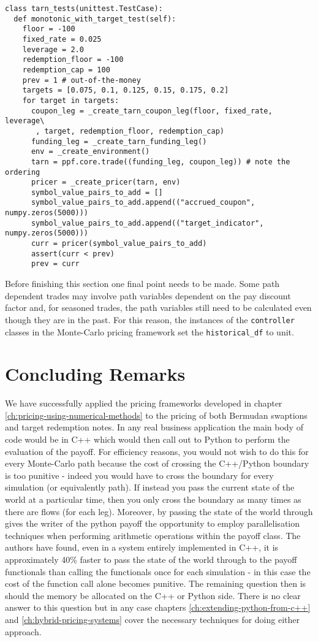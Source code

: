 \begin{verbatim}
class tarn_tests(unittest.TestCase):
  def monotonic_with_target_test(self):
    floor = -100
    fixed_rate = 0.025
    leverage = 2.0
    redemption_floor = -100
    redemption_cap = 100
    prev = 1 # out-of-the-money
    targets = [0.075, 0.1, 0.125, 0.15, 0.175, 0.2]
    for target in targets:
      coupon_leg = _create_tarn_coupon_leg(floor, fixed_rate, leverage\
       , target, redemption_floor, redemption_cap)
      funding_leg = _create_tarn_funding_leg()
      env = _create_environment()
      tarn = ppf.core.trade((funding_leg, coupon_leg)) # note the ordering
      pricer = _create_pricer(tarn, env)
      symbol_value_pairs_to_add = []
      symbol_value_pairs_to_add.append(("accrued_coupon", numpy.zeros(5000)))
      symbol_value_pairs_to_add.append(("target_indicator", numpy.zeros(5000)))
      curr = pricer(symbol_value_pairs_to_add)
      assert(curr < prev)
      prev = curr
\end{verbatim}

Before finishing this section one final point needs to be made. Some path dependent trades may involve path variables dependent on the pay discount factor and, for seasoned trades, the 
path variables still need to be calculated even though they are in the past. For this reason, the instances of the \verb|controller| classes in the Monte-Carlo pricing framework set the \verb|historical_df| to unit. 

\section{Concluding Remarks}

We have successfully applied the pricing frameworks developed in chapter \ref{ch:pricing-using-numerical-methods} to the pricing of both Bermudan swaptions and target redemption notes. In any real business application the main body of code would be in C++ which would then call out to Python to perform the evaluation of the payoff. For efficiency reasons, you would not wish to do this for every Monte-Carlo path because the cost of crossing the C++/Python boundary is too punitive - indeed you would have to cross the boundary for every simulation (or equivalently path). If instead you pass the current state of the world at a particular time, then you only cross the boundary as many times as there are flows (for each leg). Moreover, by passing the state of the world through gives the writer of the python payoff the opportunity to employ parallelisation techniques when performing arithmetic operations within the payoff class. The authors have found, even in a system entirely implemented in C++, it is approximately 40\% faster to pass the state of the world through to the payoff functionals than calling the functionals once for each simulation - in this case the cost of the function call alone becomes punitive. The remaining question then is should the memory be allocated on the C++ or Python side. There is no clear answer to this question but in any case chapters \ref{ch:extending-python-from-c++} and \ref{ch:hybrid-pricing-systems} cover the necessary techniques for doing either approach. 

